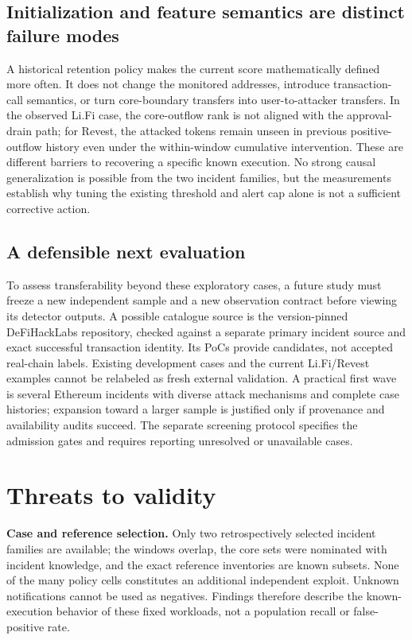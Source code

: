 \documentclass[preprint,12pt,authoryear]{elsarticle}
\begin{document}
\subsection{Initialization and feature semantics are distinct failure modes}\label{initialization-and-feature-semantics-are-distinct-failure-modes}

A historical retention policy makes the current score mathematically defined more often. It does not change the monitored addresses, introduce transaction-call semantics, or turn core-boundary transfers into user-to-attacker transfers. In the observed Li.Fi case, the core-outflow rank is not aligned with the approval-drain path; for Revest, the attacked tokens remain unseen in previous positive-outflow history even under the within-window cumulative intervention. These are different barriers to recovering a specific known execution. No strong causal generalization is possible from the two incident families, but the measurements establish why tuning the existing threshold and alert cap alone is not a sufficient corrective action.

\subsection{A defensible next evaluation}\label{a-defensible-next-evaluation}

To assess transferability beyond these exploratory cases, a future study must freeze a new independent sample and a new observation contract before viewing its detector outputs. A possible catalogue source is the version-pinned DeFiHackLabs repository, checked against a separate primary incident source and exact successful transaction identity. Its PoCs provide candidates, not accepted real-chain labels. Existing development cases and the current Li.Fi/Revest examples cannot be relabeled as fresh external validation. A practical first wave is several Ethereum incidents with diverse attack mechanisms and complete case histories; expansion toward a larger sample is justified only if provenance and availability audits succeed. The separate screening protocol specifies the admission gates and requires reporting unresolved or unavailable cases.

\section{Threats to validity}\label{threats-to-validity}

\textbf{Case and reference selection.} Only two retrospectively selected incident families are available; the windows overlap, the core sets were nominated with incident knowledge, and the exact reference inventories are known subsets. None of the many policy cells constitutes an additional independent exploit. Unknown notifications cannot be used as negatives. Findings therefore describe the known-execution behavior of these fixed workloads, not a population recall or false-positive rate.
\end{document}
